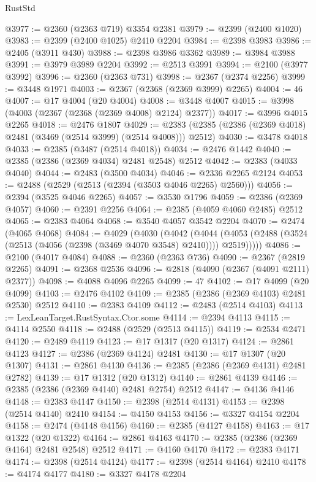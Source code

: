 \begin{lexlean}{RustStd}
\begin{coremodule}
{\begin{coremodule}
{{{{{{{{{{{{{{{{{{{{{{{{{{{{{{{{{{{{{{{{{{{{{{{{{{@3977 := @2360 (@2363 @719) @3354 @2381
@3979 := @2399 (@2400 @1020)
@3983 := @2399 (@2400 @1025) @2410 @2204
@3984 := @2398 @3983
@3986 := @2405 (@3911 @430)
@3988 := @2398 @3986 @3362
@3989 := @3984 @3988
@3991 := @3979 @3989 @2204
@3992 := @2513 @3991
@3994 := @2100 (@3977 @3992)
@3996 := @2360 (@2363 @731)
@3998 := @2367 (@2374 @2256)
@3999 := @3448 @1971
@4003 := @2367 (@2368 (@2369 @3999) @2265)
@4004 := 46
@4007 := @17 @4004 (@20 @4004)
@4008 := @3448 @4007
@4015 := @3998 (@4003 (@2367 (@2368 (@2369 @4008) @2124) @2377))
@4017 := @3996 @4015 @2265
@4018 := @2476 @1807
@4029 := @2383 (@2385 (@2386 (@2369 @4018) @2481 (@3469 (@2514 @3999) (@2514 @4008))) @2512)
@4030 := @3478 @4018
@4033 := @2385 (@3487 (@2514 @4018))
@4034 := @2476 @1442
@4040 := @2385 (@2386 (@2369 @4034) @2481 @2548) @2512
@4042 := @2383 (@4033 @4040)
@4044 := @2483 (@3500 @4034)
@4046 := @2336 @2265 @2124
@4053 := @2488 (@2529 (@2513 (@2394 (@3503 @4046 @2265) @2560)))
@4056 := @2394 (@3525 @4046 @2265)
@4057 := @3530 @1796
@4059 := @2386 (@2369 @4057)
@4060 := @2391 @2256
@4064 := @2385 (@4059 @4060 @2485) @2512
@4065 := @2383 @4064
@4068 := @3540 @4057 @3542 @2204
@4070 := @2474 (@4065 @4068)
@4084 := @4029
    (@4030
      (@4042
        (@4044 (@4053 (@2488 (@3524 (@2513 (@4056 (@2398 (@3469 @4070 @3548) @2410)))) @2519)))))
@4086 := @2100 (@4017 @4084)
@4088 := @2360 (@2363 @736)
@4090 := @2367 (@2819 @2265)
@4091 := @2368 @2536
@4096 := @2818 (@4090 (@2367 (@4091 @2111) @2377))
@4098 := @4088 @4096 @2265
@4099 := 47
@4102 := @17 @4099 (@20 @4099)
@4103 := @2476 @4102
@4109 := @2385 (@2386 (@2369 @4103) @2481 @2530) @2512
@4110 := @2383 @4109
@4112 := @2483 (@2514 @4103)
@4113 := LexLeanTarget.RustSyntax.Ctor.some
@4114 := @2394 @4113
@4115 := @4114 @2550
@4118 := @2488 (@2529 (@2513 @4115))
@4119 := @2534 @2471
@4120 := @2489 @4119
@4123 := @17 @1317 (@20 @1317)
@4124 := @2861 @4123
@4127 := @2386 (@2369 @4124) @2481
@4130 := @17 @1307 (@20 @1307)
@4131 := @2861 @4130
@4136 := @2385 (@2386 (@2369 @4131) @2481 @2782)
@4139 := @17 @1312 (@20 @1312)
@4140 := @2861 @4139
@4146 := @2385 (@2386 (@2369 @4140) @2481 @2754) @2512
@4147 := @4136 @4146
@4148 := @2383 @4147
@4150 := @2398 (@2514 @4131)
@4153 := @2398 (@2514 @4140) @2410
@4154 := @4150 @4153
@4156 := @3327 @4154 @2204
@4158 := @2474 (@4148 @4156)
@4160 := @2385 (@4127 @4158)
@4163 := @17 @1322 (@20 @1322)
@4164 := @2861 @4163
@4170 := @2385 (@2386 (@2369 @4164) @2481 @2548) @2512
@4171 := @4160 @4170
@4172 := @2383 @4171
@4174 := @2398 (@2514 @4124)
@4177 := @2398 (@2514 @4164) @2410
@4178 := @4174 @4177
@4180 := @3327 @4178 @2204
}}}}}}}}}}}}}}}}}}}}}}}}}}}}}}}}}}}}}}}}}}}}}}}}}}
\end{coremodule}}
\end{coremodule}
\end{lexlean}
